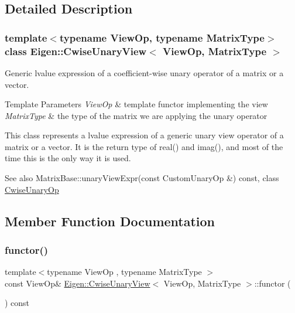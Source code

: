 \subsection{Detailed Description}
\subsubsection*{template$<$typename View\+Op, typename Matrix\+Type$>$\newline
class Eigen\+::\+Cwise\+Unary\+View$<$ View\+Op, Matrix\+Type $>$}

Generic lvalue expression of a coefficient-\/wise unary operator of a matrix or a vector. 


\begin{DoxyTemplParams}{Template Parameters}
{\em View\+Op} & template functor implementing the view \\
\hline
{\em Matrix\+Type} & the type of the matrix we are applying the unary operator\\
\hline
\end{DoxyTemplParams}
This class represents a lvalue expression of a generic unary view operator of a matrix or a vector. It is the return type of real() and imag(), and most of the time this is the only way it is used.

\begin{DoxySeeAlso}{See also}
Matrix\+Base\+::unary\+View\+Expr(const Custom\+Unary\+Op \&) const, class \mbox{\hyperlink{class_eigen_1_1_cwise_unary_op}{Cwise\+Unary\+Op}} 
\end{DoxySeeAlso}


\subsection{Member Function Documentation}
\mbox{\label{class_eigen_1_1_cwise_unary_view_af01271cdadcbcf195b5d3130ff2e1a48}} 
\subsubsection{\texorpdfstring{functor()}{functor()}}
{\footnotesize\ttfamily template$<$typename View\+Op , typename Matrix\+Type $>$ \\
const View\+Op\& \mbox{\hyperlink{class_eigen_1_1_cwise_unary_view}{Eigen\+::\+Cwise\+Unary\+View}}$<$ View\+Op, Matrix\+Type $>$\+::functor (\begin{DoxyParamCaption}{ }\end{DoxyParamCaption}) const\hspace{0.3cm}{\ttfamily [inline]}}

